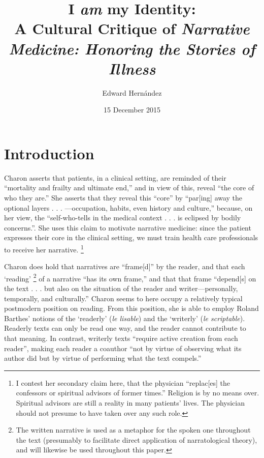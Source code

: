 \documentclass[12pt]{article}
\begin{document}
\title{I \emph{am} my Identity: \\ A Cultural Critique of \emph{Narrative Medicine: Honoring the Stories of Illness}}
\author{Edward Hern\'{a}ndez}
\date{15 December 2015}
\maketitle


\section{Introduction}

Charon asserts that patients, in a clinical setting, are reminded of their
``mortality and frailty and ultimate end,''\autocite[p.~78]{Charon06} and in
view of this, reveal ``the core of who they are.''\autocite[p.~78]{Charon06}
She asserts that they reveal this ``core'' by ``par[ing] away the optional
layers . . . ---occupation, habits, even history and
culture,''\autocite[p.~78]{Charon06} because, on her view, the ``self-who-tells
in the medical context . . . is eclipsed by bodily
concerns.''\autocite[p.~78]{Charon06}. She uses this claim to motivate
narrative medicine: since the patient expresses their core in the clinical
setting, we must train health care professionals to receive her narrative.%
	\footnote{I contest her secondary claim here, that the physician
	``replac[es] the confessors or spiritual advisors of former times.''
	Religion is by no means over. Spiritual advisors are still a reality in
	many patients' lives. The physician should not presume to have taken over
	any such role.}

Charon does hold that narratives are ``frame[d]''\autocite[p.~114]{Charon06}
by the reader, and that each `reading'%
	\footnote{The written narrative is used as a metaphor for the spoken one
	throughout the text (presumably to facilitate direct application of
	narratological theory), and will likewise be used throughout this paper.}
of a narrative ``has its own frame,''\autocite[p.~115]{Charon06} and that that
frame ``depend[s] on the text . . . but also on the situation of the reader and
writer---personally, temporally, and culturally.''\autocite[p.~115]{Charon06}
Charon seems to here occupy a relatively typical postmodern position on
reading.\autocite[p.~40]{Charon06} From this position, she is able to employ
Roland Barthes' notions of the `readerly' (\emph{le lisable}) and the
`writerly' (\emph{le scriptable}).\autocite{Barthes70} Readerly texts can only 
be read one way, and the reader cannot contribute to that meaning. In contrast,
writerly texts ``require active creation from each
reader''\autocite[p.~46]{Charon06}, making each reader a coauthor ``not by
virtue of observing what its author did but by virtue of performing what the
text compels.''\autocite[p.~46]{Charon06}
\end{document}
